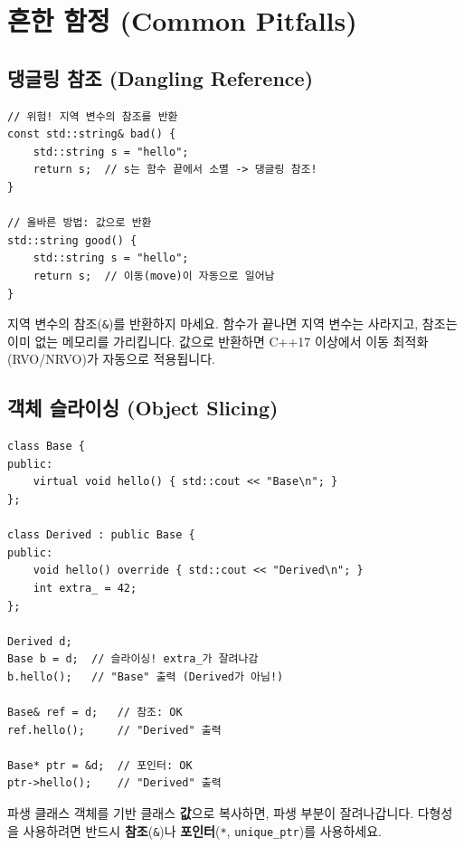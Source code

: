 \documentclass[11pt,a4paper]{book}
\newcommand{\code}[1]{\texttt{#1}}
\begin{document}
\chapter{흔한 함정 (Common Pitfalls)}
\label{app:pitfalls}

\section{댕글링 참조 (Dangling Reference)}

\begin{lstlisting}[style=cpp]
// 위험! 지역 변수의 참조를 반환
const std::string& bad() {
    std::string s = "hello";
    return s;  // s는 함수 끝에서 소멸 -> 댕글링 참조!
}

// 올바른 방법: 값으로 반환
std::string good() {
    std::string s = "hello";
    return s;  // 이동(move)이 자동으로 일어남
}
\end{lstlisting}

\begin{warningbox}
지역 변수의 참조(\code{\&})를 반환하지 마세요. 함수가 끝나면 지역 변수는 사라지고, 참조는 이미 없는 메모리를 가리킵니다. 값으로 반환하면 C++17 이상에서 이동 최적화(RVO/NRVO)가 자동으로 적용됩니다.
\end{warningbox}

\section{객체 슬라이싱 (Object Slicing)}

\begin{lstlisting}[style=cpp]
class Base {
public:
    virtual void hello() { std::cout << "Base\n"; }
};

class Derived : public Base {
public:
    void hello() override { std::cout << "Derived\n"; }
    int extra_ = 42;
};

Derived d;
Base b = d;  // 슬라이싱! extra_가 잘려나감
b.hello();   // "Base" 출력 (Derived가 아님!)

Base& ref = d;   // 참조: OK
ref.hello();     // "Derived" 출력

Base* ptr = &d;  // 포인터: OK
ptr->hello();    // "Derived" 출력
\end{lstlisting}

\begin{warningbox}
파생 클래스 객체를 기반 클래스 \textbf{값}으로 복사하면, 파생 부분이 잘려나갑니다. 다형성을 사용하려면 반드시 \textbf{참조}(\code{\&})나 \textbf{포인터}(\code{*}, \code{unique\_ptr})를 사용하세요.
\end{warningbox}
\end{document}
